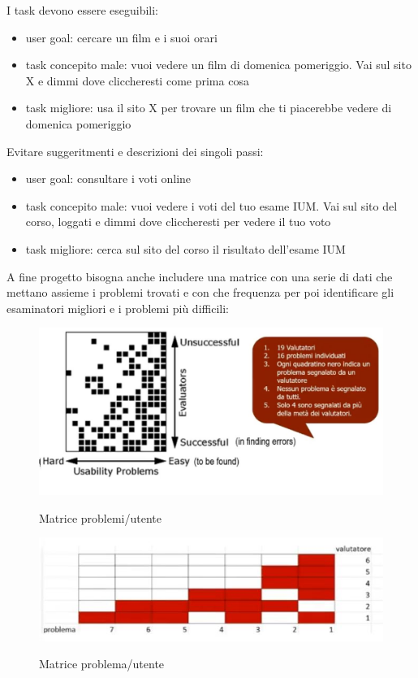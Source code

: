\documentclass[11pt,a4paper]{book}
\begin{document}
I task devono essere eseguibili:
\begin{itemize}
	\item user goal: cercare un film e i suoi orari
	\item task concepito male: vuoi vedere un film di domenica pomeriggio. Vai sul sito X e dimmi dove cliccheresti come prima cosa
	\item task migliore: usa il sito X per trovare un film che ti piacerebbe vedere di domenica pomeriggio
\end{itemize}

Evitare suggeritmenti e descrizioni dei singoli passi:
\begin{itemize}
	\item user goal: consultare i voti online
	\item task concepito male: vuoi vedere i voti del tuo esame IUM. Vai sul sito del corso, loggati e dimmi dove cliccheresti per vedere il tuo voto
	\item task migliore: cerca sul sito del corso il risultato dell'esame IUM
\end{itemize}

A fine progetto bisogna anche includere una matrice con una serie di dati che mettano assieme i problemi trovati e con che frequenza per poi identificare gli esaminatori migliori e i problemi più difficili:
\begin{figure}[h!]
	\begin{center}
		\includegraphics[scale=0.6]{img/014.jpg}
		\caption{Matrice problemi/utente}
		\label{fig: 014}
		\includegraphics[scale=0.6]{img/015.jpg}
		\caption{Matrice problema/utente}
		\label{fig: 015}
	\end{center}
\end{figure}
\end{document}
